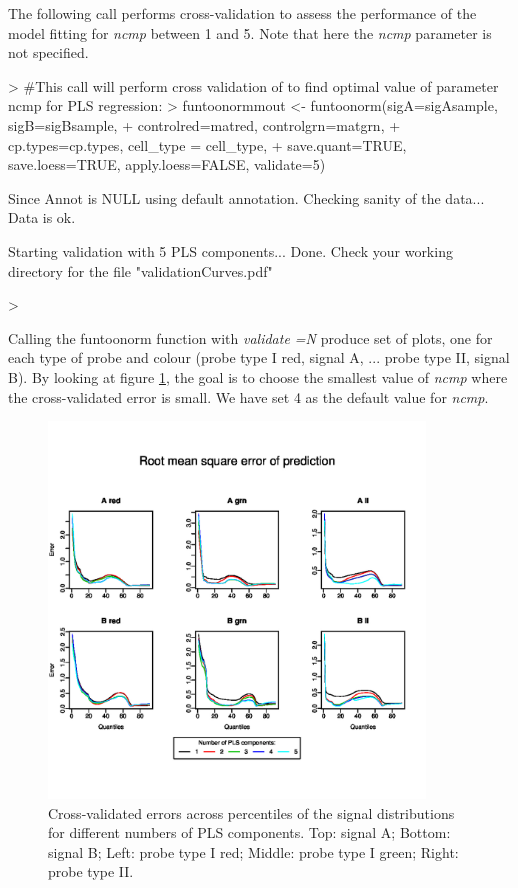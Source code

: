 \documentclass{article}
\begin{document}
The following call performs cross-validation to assess the performance of the model fitting for \emph{ncmp} between 1 and 5.  
Note that here the \emph{ncmp} parameter is not specified.
\begin{Schunk}
\begin{Sinput}
>     #This call  will perform cross validation of to find optimal value of parameter ncmp for PLS regression:
>     funtoonormmout <- funtoonorm(sigA=sigAsample, sigB=sigBsample,
+                       controlred=matred, controlgrn=matgrn, 
+                       cp.types=cp.types, cell_type = cell_type,
+                       save.quant=TRUE, save.loess=TRUE, apply.loess=FALSE, validate=5)
\end{Sinput}
\begin{Soutput}
Since Annot is NULL using default annotation. 
Checking sanity of the data... 
Data is ok. 

 Starting validation with  5  PLS components... 
Done. Check your working directory for the file "validationCurves.pdf" 
\end{Soutput}
\begin{Sinput}
> 
\end{Sinput}
\end{Schunk}

Calling the funtoonorm function with \emph{validate =N} produce set of plots, one for each type of probe and colour (probe type I red, signal A, ... probe type II, signal B).  By looking at figure \ref{val}, the goal is to choose the smallest value of \emph{ncmp} where the cross-validated error is small.
We have set 4 as the default value for \emph{ncmp}.



\begin{figure}[val]
\centering
\includegraphics[width=10cm,height=10cm]{valid.jpg}
\caption{Cross-validated errors across percentiles of the signal distributions for different numbers of PLS components.  Top: signal A; Bottom: signal B;  Left: probe type I red; Middle: probe type I green; Right: probe type II.} \label{val}
\end{figure}
\end{document}
